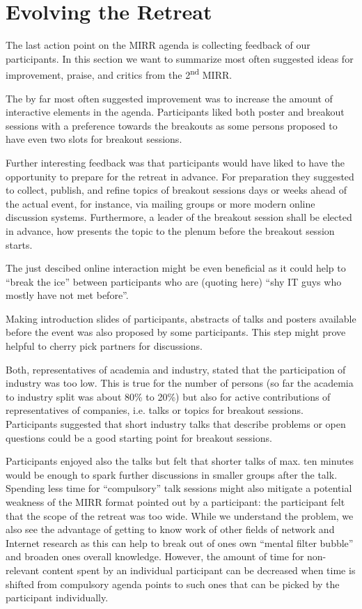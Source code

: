 \section{Evolving the Retreat}\label{sec:evolution}

The last action point on the MIRR agenda is collecting feedback of our participants. In this section we want to summarize most often suggested ideas for improvement, praise, and critics from the 2\textsuperscript{nd} MIRR.

The by far most often suggested improvement was to increase the amount of interactive elements in the agenda. Participants liked both poster and breakout sessions with a preference towards the breakouts as some persons proposed to have even two slots for breakout sessions.

Further interesting feedback was that participants would have liked to have the opportunity to prepare for the retreat in advance. For preparation they suggested to collect, publish, and refine topics of breakout sessions days or weeks ahead of the actual event, for instance, via mailing groups or more modern online discussion systems. Furthermore, a leader of the breakout session shall be elected in advance, how presents the topic to the plenum before the breakout session starts.

The just descibed online interaction might be even beneficial as it could help to ``break the ice'' between participants who are (quoting here) ``shy IT guys who mostly have not met before''.

Making introduction slides of participants, abstracts of talks and posters available before the event was also proposed by some participants. This step might prove helpful to cherry pick partners for discussions.

Both, representatives of academia and industry, stated that the participation of industry was too low. This is true for the number of persons (so far the academia to industry split was about 80\% to 20\%) but also for active contributions of representatives of companies, i.e. talks or topics for breakout sessions. Participants suggested that short industry talks that describe problems or open questions could be a good starting point for breakout sessions.

Participants enjoyed also the talks but felt that shorter talks of max. ten minutes would be enough to spark further discussions in smaller groups after the talk. Spending less time for ``compulsory'' talk sessions might also mitigate a potential weakness of the MIRR format pointed out by a participant: the participant felt that the scope of the retreat was too wide. While we understand the problem, we also see the advantage of getting to know work of other fields of network and Internet research as this can help to break out of ones own ``mental filter bubble'' and broaden ones overall knowledge. However, the amount of time for non-relevant content spent by an individual participant can be decreased when time is shifted from compulsory agenda points to such ones that can be picked by the participant individually.

